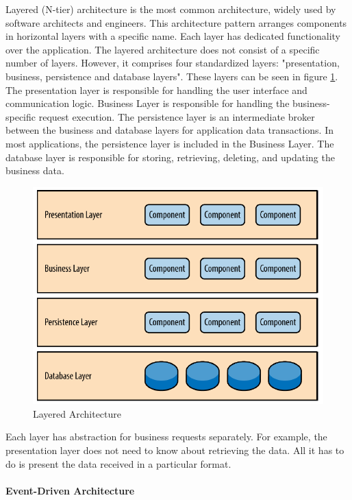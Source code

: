\documentclass[12pt,a4paper]{article}
\begin{document}
Layered (N-tier) architecture is the most common architecture, widely used by software architects and engineers. This architecture pattern arranges components in horizontal layers with a specific name. Each layer has dedicated functionality over the application. The layered architecture does not consist of a specific number of layers. However, it comprises four standardized layers: "presentation, business, persistence and database layers". These layers can be seen in figure \ref{layered}. The presentation layer is responsible for handling the user interface and communication logic. Business Layer is responsible for handling the business-specific request execution. The persistence layer is an intermediate broker between the business and database layers for application data transactions. In most applications, the persistence layer is included in the Business Layer. The database layer is responsible for storing, retrieving, deleting, and updating the business data. \cite{r18} 

\begin{figure}[H]
\centering
\includegraphics[scale=0.5]{layered.PNG}
\caption{Layered Architecture \cite{r18}}
\label{layered}
\end{figure}

Each layer has abstraction for business requests separately. For example, the presentation layer does not need to know about retrieving the data. All it has to do is present the data received in a particular format. \cite{r18}

\paragraph{Event-Driven Architecture}
\end{document}
